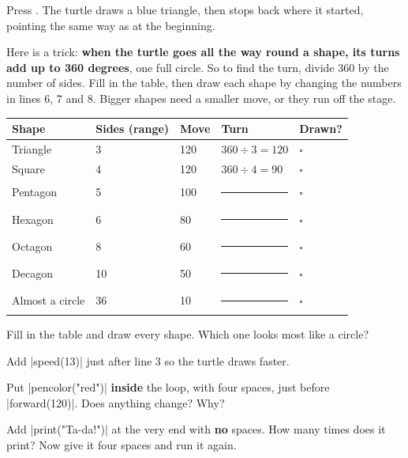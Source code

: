 Press \playbtn. The turtle draws a blue triangle, then stops back where it started, pointing the same way as at the beginning.


Here is a trick: \textbf{when the turtle goes all the way round a shape, its turns add up to 360 degrees}, one full circle. So to find the turn, divide 360 by the number of sides. Fill in the table, then draw each shape by changing the numbers in lines 6, 7 and 8. Bigger shapes need a smaller move, or they run off the stage.

\begin{center}
\renewcommand{\arraystretch}{1.3}
\begin{tabular}{P{3.2cm} P{2.6cm} P{2.0cm} P{3.4cm} P{1.6cm}}
\toprule
\textbf{Shape} & \textbf{Sides (range)} & \textbf{Move} & \textbf{Turn} & \textbf{Drawn?} \\
\midrule
Triangle & 3 & 120 & $360 \div 3 = 120$ & $\square$ \\
Square & 4 & 120 & $360 \div 4 = 90$ & $\square$ \\
Pentagon & 5 & 100 & \rule{2.2cm}{0.5pt} & $\square$ \\
Hexagon & 6 & 80 & \rule{2.2cm}{0.5pt} & $\square$ \\
Octagon & 8 & 60 & \rule{2.2cm}{0.5pt} & $\square$ \\
Decagon & 10 & 50 & \rule{2.2cm}{0.5pt} & $\square$ \\
Almost a circle & 36 & 10 & \rule{2.2cm}{0.5pt} & $\square$ \\
\bottomrule
\end{tabular}
\end{center}

\begin{challenge}
\tick Fill in the table and draw every shape. Which one looks most like a circle?\par
\tick Add \py|speed(13)| just after line 3 so the turtle draws faster.\par
\tick Put \py|pencolor("red")| \textbf{inside} the loop, with four spaces, just before \py|forward(120)|. Does anything change? Why?\par
\tick Add \py|print("Ta-da!")| at the very end with \textbf{no} spaces. How many times does it print? Now give it four spaces and run it again.
\end{challenge}



